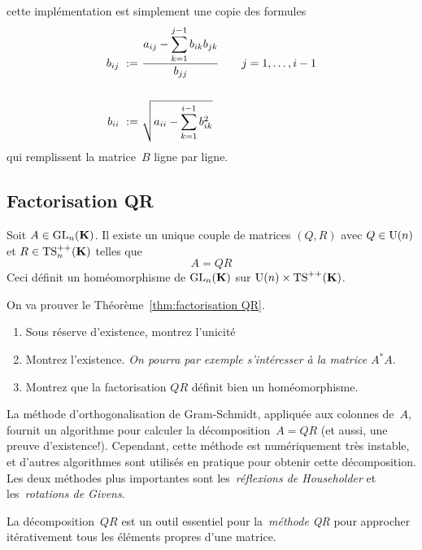 cette implémentation est simplement une copie des formules
\begin{align*}
	b_{ij} \ :=\  & \displaystyle\frac{\displaystyle a_{ij}-\sum_{k=1}^{j-1}b_{ik}b_{jk}}{b_{jj}} 
	\qquad j=1,\ldots, i-1
	\\
	& \\
	b_{ii} \ :=\  & \displaystyle\sqrt{a_{ii}-\sum_{k=1}^{i-1}b^2_{ik}}
\end{align*}
qui remplissent la matrice~$B$ ligne par ligne.




\subsection{Factorisation QR}

\begin{theorem}
\label{thm:factorisation QR}
Soit $A \in\mathrm{GL}_n(\mathbf{K})$. Il existe un unique couple de matrices $(Q,R)$ avec $Q
\in \mathrm{U}(n)$ et $R \in \mathrm{TS}^{++}_n(\mathbf{K})$ telles que
\[
A = QR
\]
Ceci définit un homéomorphisme de $\mathrm{GL}_n(\mathbf{K})$ sur $\mathrm{U}(n)\times\mathrm{TS}^{++}(\mathbf{K})$.
\end{theorem}

\begin{exercice}
On va prouver le Théorème~\ref{thm:factorisation QR}.
\begin{enumerate}
\item Sous réserve d'existence, montrez l'unicité
\item Montrez l'existence. \emph{On pourra par exemple s'intéresser à la matrice $A^*A$}.
\item Montrez que la factorisation $QR$ définit bien un homéomorphisme.
\end{enumerate}
\end{exercice}

La méthode d'orthogonalisation de Gram-Schmidt, appliquée aux colonnes
de~$A$, fournit un algorithme pour calculer la décomposition~$A=QR$ (et
aussi, une preuve d'existence!).  Cependant, cette méthode est numériquement
très instable, et d'autres algorithmes sont utilisés en pratique pour obtenir
cette décomposition.  Les deux méthodes plus importantes sont
les~\emph{réflexions de Householder} et les~\emph{rotations de Givens}.

La décomposition~$QR$ est un outil essentiel pour la~\emph{méthode QR} pour
approcher itérativement tous les éléments propres d'une matrice.





